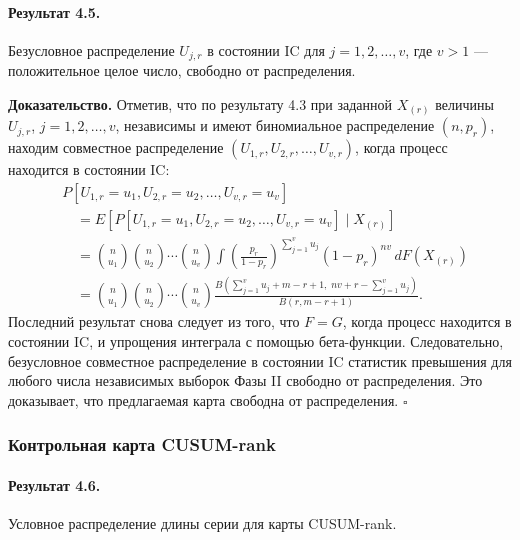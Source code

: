 \paragraph{Результат 4.5.} Безусловное распределение \(U_{j,r}\) в состоянии IC для \(j = 1, 2, \ldots, v\), где \(v > 1\) --- положительное целое число, свободно от распределения.

\noindent\textbf{Доказательство.} Отметив, что по результату 4.3 при заданной \(X_{(r)}\) величины \(U_{j,r}\), \(j = 1, 2, \ldots, v\), независимы и имеют биномиальное распределение \((n, p_r)\), находим совместное распределение \((U_{1,r}, U_{2,r}, \ldots, U_{v,r})\), когда процесс находится в состоянии IC:
\begin{align*}
	&P\left[ U_{1,r} = u_1, U_{2,r} = u_2, \ldots, U_{v,r} = u_v \right] \\
	&\quad = E\left[ P\left[ U_{1,r} = u_1, U_{2,r} = u_2, \ldots, U_{v,r} = u_v \right] \mid X_{(r)} \right] \\
	&\quad = \binom{n}{u_1}\binom{n}{u_2}\cdots\binom{n}{u_v}\int \left( \frac{p_r}{1 - p_r} \right)^{\sum_{j=1}^{v} u_j}(1 - p_r)^{nv}\, dF\left( X_{(r)} \right) \\
	&\quad = \binom{n}{u_1}\binom{n}{u_2}\cdots\binom{n}{u_v}\frac{B\left( \sum_{j=1}^{v} u_j + m - r + 1,\; nv + r - \sum_{j=1}^{v} u_j \right)}{B(r, m - r + 1)}.
\end{align*}
Последний результат снова следует из того, что \(F = G\), когда процесс находится в состоянии IC, и упрощения интеграла с помощью бета-функции. Следовательно, безусловное совместное распределение в состоянии IC статистик превышения для любого числа независимых выборок Фазы II свободно от распределения. Это доказывает, что предлагаемая карта свободна от распределения. \(\square\)

\subsubsection{Контрольная карта CUSUM-rank}

\paragraph{Результат 4.6.} Условное распределение длины серии для карты CUSUM-rank.

